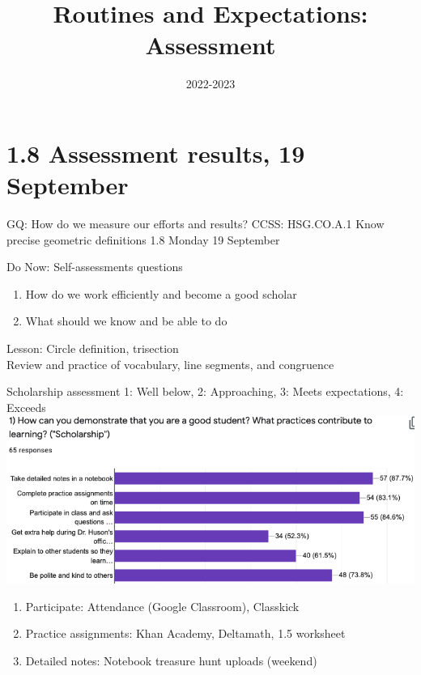 

\title{Routines and Expectations: Assessment}
\date{2022-2023}


\frame{\titlepage}

\section[Outline]{}
\frame{\tableofcontents}

\section{1.8 Assessment results, 19 September}
\begin{frame}{GQ: How do we measure our efforts and results?}
  {CCSS: HSG.CO.A.1 Know precise geometric definitions  \hfill \alert{1.8 Monday 19 September}}

  \begin{block}{Do Now: Self-assessments questions}
  \begin{enumerate}
      \item How do we work efficiently and become a good scholar
      \item What should we know and be able to do
  \end{enumerate}
  \end{block}
  Lesson: Circle definition, trisection \\
  Review and practice of vocabulary, line segments, and congruence
\end{frame}

\begin{frame}{Scholarship assessment}
  {1: Well below, 2: Approaching, 3: Meets expectations, 4: Exceeds}
  \includegraphics[width=.95\textwidth]{../graphics/scholarship-bar-chart.png}
  \begin{enumerate}
    \item Participate: Attendance (Google Classroom), Classkick
    \item Practice assignments: Khan Academy, Deltamath, 1.5 worksheet
    \item Detailed notes: Notebook treasure hunt uploads (weekend)
  \end{enumerate}
\end{frame}

